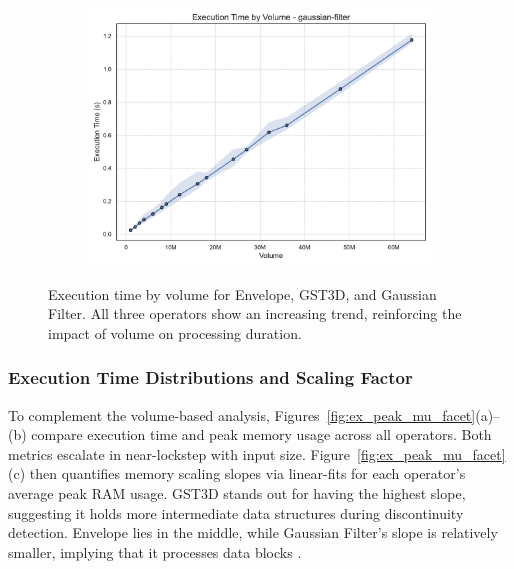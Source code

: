 \begin{figure}[htbp]
\begin{subfigure}[t]{0.49\textwidth}
        \includegraphics[width=\textwidth]{assets/images/05/execution_time_by_volume_gaussian-filter}
    \end{subfigure}
    \caption{
        Execution time by volume for Envelope, \ac{GST3D}, and Gaussian Filter.
        All three operators show an increasing trend, reinforcing the impact of volume on processing duration.
        \label{fig:execution_time_by_volume_facet}
    }
\end{figure}

\subsubsection{Execution Time Distributions and Scaling Factor}
\label{subsec:execution-time-distributions-and-scaling}

To complement the volume-based analysis, Figures~\ref{fig:ex_peak_mu_facet}(a)--(b) compare execution time and peak memory usage across all operators.
Both metrics escalate in near-lockstep with input size.
Figure~\ref{fig:ex_peak_mu_facet}(c) then quantifies memory scaling slopes via linear-fits for each operator’s average peak \ac{RAM} usage.
\ac{GST3D} stands out for having the highest slope, suggesting it holds more intermediate data structures during discontinuity detection.
Envelope lies in the middle, while Gaussian Filter’s slope is relatively smaller, implying that it processes data blocks .

